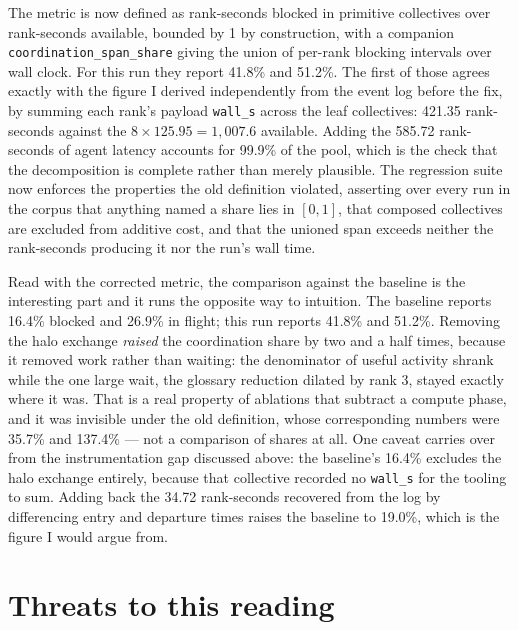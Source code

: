 \documentclass[11pt]{article}
\begin{document}
The metric is now defined as rank-seconds blocked in primitive collectives over rank-seconds
available, bounded by 1 by construction, with a companion \texttt{coordination\_span\_share} giving
the union of per-rank blocking intervals over wall clock. For this run they report 41.8\% and 51.2\%.
The first of those agrees exactly with the figure I derived independently from the event log before
the fix, by summing each rank's payload \texttt{wall\_s} across the leaf collectives: 421.35
rank-seconds against the $8\times125.95=1{,}007.6$ available. Adding the 585.72 rank-seconds of agent
latency accounts for 99.9\% of the pool, which is the check that the decomposition is complete rather
than merely plausible. The regression suite now enforces the properties the old definition violated,
asserting over every run in the corpus that anything named a share lies in $[0,1]$, that composed
collectives are excluded from additive cost, and that the unioned span exceeds neither the
rank-seconds producing it nor the run's wall time.

Read with the corrected metric, the comparison against the baseline is the interesting part and it
runs the opposite way to intuition. The baseline reports 16.4\% blocked and 26.9\% in flight; this run
reports 41.8\% and 51.2\%. Removing the halo exchange \emph{raised} the coordination share by
two and a half times, because it removed work rather than waiting: the denominator of useful activity
shrank while the one large wait, the glossary reduction dilated by rank 3, stayed exactly where it
was. That is a real property of ablations that subtract a compute phase, and it was invisible under
the old definition, whose corresponding numbers were 35.7\% and 137.4\% --- not a comparison of
shares at all. One caveat carries over from the instrumentation gap discussed above: the baseline's
16.4\% excludes the halo exchange entirely, because that collective recorded no \texttt{wall\_s} for
the tooling to sum. Adding back the 34.72 rank-seconds recovered from the log by differencing entry
and departure times raises the baseline to 19.0\%, which is the figure I would argue from.

\section{Threats to this reading}
\end{document}
